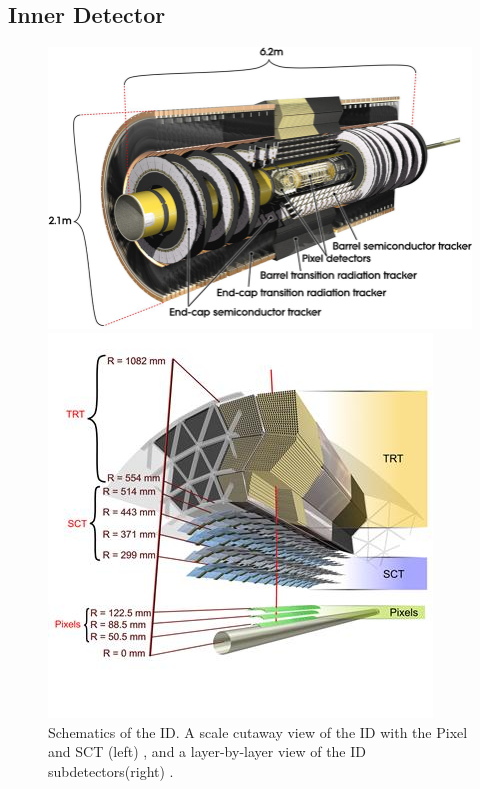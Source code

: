 \subsection{Inner Detector}  \label{ssec:innerdetector}
\begin{figure}[!thp]
    \begin{minipage}[c]{.53\textwidth}
        \includegraphics[width=\textwidth]{chapters/chapter2_experiment/images/id_slice.png}
    \end{minipage}
    \begin{minipage}[c]{.45\textwidth}
        \includegraphics[width=\textwidth]{chapters/chapter2_experiment/images/id_layer.jpg} 
    \end{minipage}
    \caption[Schematics of the \gls{ID}]{Schematics of the \gls{ID}. A scale cutaway view of the \gls{ID} with the Pixel and \gls{SCT} (left) \cite{pixel-electronics}, and a layer-by-layer view of the \gls{ID} subdetectors\footnotemark (right) \cite{id-perf2015}.}
\end{figure}

